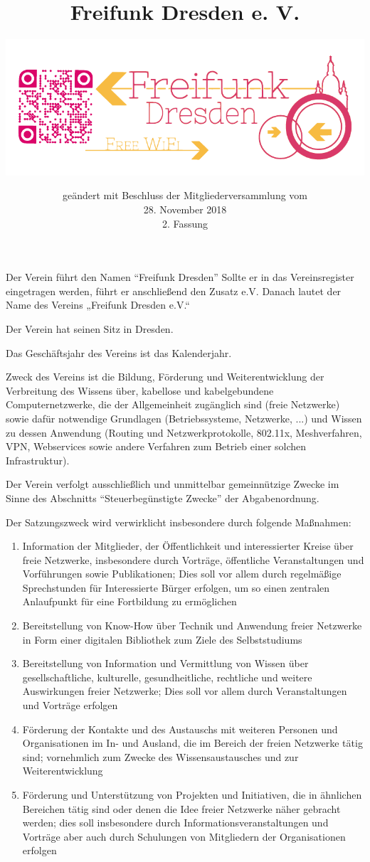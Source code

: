 \documentclass[parskip]{scrartcl}
\title{Freifunk Dresden e. V.}
\subtitle{\href{https://www.freifunk-dresden.de}{\includegraphics{assets/Logo_Freifunk_Dresden}}}
\date{geändert mit Beschluss der Mitgliederversammlung vom\\28. November 2018\\2. Fassung}
\begin{document}
\maketitle
\tableofcontents\newpage

\begin{contract} %

Der Verein führt den Namen “Freifunk Dresden” Sollte er in das Vereinsregister eingetragen werden, führt er anschließend den Zusatz e.V. Danach lautet der Name des Vereins „Freifunk Dresden e.V.“

Der Verein hat seinen Sitz in Dresden.

Das Geschäftsjahr des Vereins ist das Kalenderjahr.


Zweck des Vereins ist die Bildung, Förderung und Weiterentwicklung der Verbreitung des Wissens über, kabellose und kabelgebundene Computernetzwerke, die der Allgemeinheit zugänglich sind (freie Netzwerke) sowie dafür notwendige Grundlagen (Betriebssysteme, Netzwerke, ...) und Wissen zu dessen Anwendung (Routing und Netzwerkprotokolle, 802.11x, Meshverfahren, VPN, Webservices sowie andere Verfahren zum Betrieb einer solchen Infrastruktur).

Der Verein verfolgt ausschließlich und unmittelbar gemeinnützige Zwecke im Sinne des Abschnitts “Steuerbegünstigte Zwecke” der Abgabenordnung.

Der Satzungszweck wird verwirklicht insbesondere durch folgende Maßnahmen:

\begin{enumerate}
\item Information der Mitglieder, der Öffentlichkeit und interessierter Kreise über freie Netzwerke, insbesondere durch Vorträge, öffentliche Veranstaltungen und Vorführungen sowie Publikationen; Dies soll vor allem durch regelmäßige Sprechstunden für Interessierte Bürger erfolgen, um so einen zentralen Anlaufpunkt für eine Fortbildung zu ermöglichen
\item Bereitstellung von Know-How über Technik und Anwendung freier Netzwerke in Form einer digitalen Bibliothek zum Ziele des Selbststudiums
\item Bereitstellung von Information und Vermittlung von Wissen über gesellschaftliche, kulturelle, gesundheitliche, rechtliche und weitere Auswirkungen freier Netzwerke; Dies soll vor allem durch Veranstaltungen und Vorträge erfolgen
\item Förderung der Kontakte und des Austauschs mit weiteren Personen und Organisationen im In- und Ausland, die im Bereich der freien Netzwerke tätig sind; vornehmlich zum Zwecke des Wissensaustausches und zur Weiterentwicklung
\item Förderung und Unterstützung von Projekten und Initiativen, die in ähnlichen Bereichen tätig sind oder denen die Idee freier Netzwerke näher gebracht werden; dies soll insbesondere durch Informationsveranstaltungen und Vorträge aber auch durch Schulungen von Mitgliedern der Organisationen erfolgen
\end{enumerate}


\end{contract}
\end{document}
